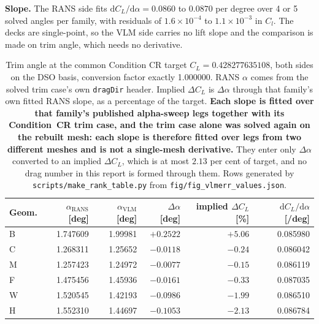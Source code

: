 \textbf{Slope.} The RANS side fits $\mathrm{d}C_L/\mathrm{d}\alpha = 0.0860$ to $0.0870$ per
degree over 4 or 5 solved angles per family, with residuals of $1.6\times10^{-4}$ to
$1.1\times10^{-3}$ in $C_l$. The decks are single-point, so the VLM side carries no lift slope and
the comparison is made on trim angle, which needs no derivative.

\begin{table}[htbp]
  \centering
  \footnotesize
  \caption{Trim angle at the common Condition CR target $C_L = 0.428277635108$, both sides on the
  DSO basis, conversion factor exactly 1.000000. RANS $\alpha$ comes from the solved trim case's
  own \texttt{dragDir} header. Implied $\Delta C_L$ is $\Delta\alpha$ through that family's own
  fitted RANS slope, as a percentage of the target. \textbf{Each slope is fitted over that
  family's published alpha-sweep legs together with its Condition~CR trim case, and the trim
  case alone was solved again on the rebuilt mesh: each slope is therefore fitted over legs
  from two different meshes and is not a single-mesh derivative.} They enter only $\Delta\alpha$ converted to
  an implied $\Delta C_L$, which is at most $2.13$ per cent of target, and no drag number in
  this report is formed through them. Rows generated by
  \texttt{scripts/make\_rank\_table.py} from \texttt{fig/fig\_vlmerr\_values.json}.}
  \label{tab:qv:lift}
  \begin{tabular}{lrrrrr}
    \toprule
    Geom. & $\alpha_\mathrm{RANS}$ [deg] & $\alpha_\mathrm{VLM}$ [deg] & $\Delta\alpha$ [deg] & implied $\Delta C_L$ [\%] & $\mathrm{d}C_L/\mathrm{d}\alpha$ [/deg] \\
    \midrule
    B & 1.747609 & 1.99981 & $+0.2522$ & $+5.06$ & 0.085980 \\
    C & 1.268311 & 1.25652 & $-0.0118$ & $-0.24$ & 0.086042 \\
    M & 1.257423 & 1.24972 & $-0.0077$ & $-0.15$ & 0.086119 \\
    F & 1.475456 & 1.45936 & $-0.0161$ & $-0.33$ & 0.087035 \\
    W & 1.520545 & 1.42193 & $-0.0986$ & $-1.99$ & 0.086510 \\
    H & 1.552310 & 1.44697 & $-0.1053$ & $-2.13$ & 0.086784 \\
    \bottomrule
  \end{tabular}
\end{table}

